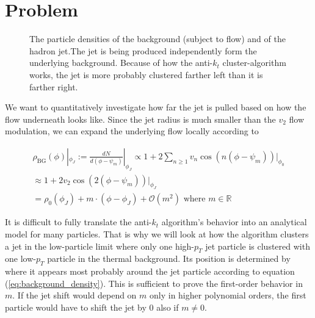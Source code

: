 \documentclass[
  a4paper,
  12pt,
  oneside,
  parskip=half,
  listof=totoc,
  bibliography=totoc,
  DIV=12,
  numbers=noenddot
  ]{scrartcl}
\begin{document}
	
\section{Problem}

\begin{figure}[H]
	\centering
	\caption{The particle densities of the background (subject to flow) and of the hadron jet.The jet is being produced independently form the underlying background. Because of how the anti-$k_t$ cluster-algorithm works, the jet is more probably clustered farther left than it is farther right.}
\end{figure}

We want to quantitatively investigate how far the jet is pulled based on how the flow underneath looks like. Since the jet radius is much smaller than the $v_2$ flow modulation, we can expand the underlying flow locally according to

\begin{equation}
	\begin{gathered}
		\rho_\text{BG}(\phi) |_{\phi_J} := \frac{d N}{d (\phi - \psi_m)} |_{\phi_J} \propto 1 + 2 \sum_{n \geq 1}^{} v_n \cos(n (\phi - \psi_m)) |_{\phi_0}\\
		\approx 1 + 2v_2 \cos(2(\phi - \psi_m)) |_{\phi_J} \\
		= \rho_0(\phi_J) + m \cdot (\phi - \phi_J) + \mathcal{O}(m^2) \text{ where } m \in \mathbb{R}
	\end{gathered}
	\label{eq:background_density}
\end{equation}

It is difficult to fully translate the anti-$k_t$ algorithm's behavior into an analytical model for many particles. That is why we will look at how the algorithm clusters a jet in the low-particle limit where only one high-$p_T$ jet particle is clustered with one low-$p_T$ particle in the thermal background. Its position is determined by where it appears most probably around the jet particle according to equation (\ref{eq:background_density}). This is sufficient to prove the first-order behavior in $m$. If the jet shift would depend on $m$ only in higher polynomial orders, the first particle would have to shift the jet by 0 also if $m \neq 0$.
\end{document}
